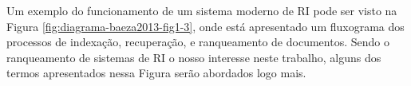 

Um exemplo do funcionamento de um sistema moderno de RI pode ser visto na Figura \ref{fig:diagrama-baeza2013-fig1-3}, onde está apresentado um fluxograma dos processos de indexação, recuperação, e ranqueamento de documentos. 
Sendo o ranqueamento de sistemas de RI o nosso interesse neste trabalho, alguns dos termos apresentados nessa Figura serão abordados logo mais.





